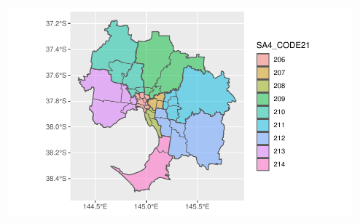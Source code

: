 \documentclass[
  letterpaper,
  DIV=11,
  numbers=noendperiod]{scrreprt}
\begin{document}
\begin{figure}

\begin{minipage}[t]{0.50\linewidth}

{\centering 


}

\subcaption{\label{fig-ASGS}}
\end{minipage}%
%
\begin{minipage}[t]{0.50\linewidth}

{\centering 

\begin{figure}

{\centering \includegraphics{03-CurrentStudy_files/figure-pdf/fig-GMelbSA2SA3SA4-1.pdf}

}
\end{figure}}
\end{minipage}
\end{figure}
\end{document}
